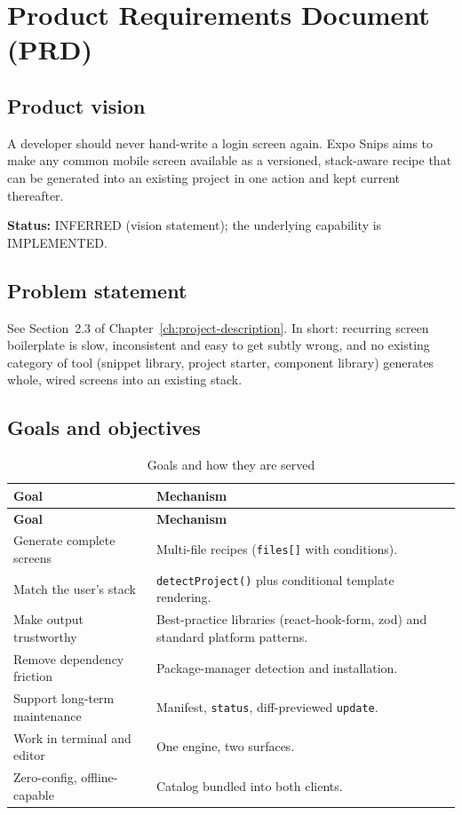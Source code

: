 \chapter{Product Requirements Document (PRD)}
\label{ch:prd}

\section{Product vision}

A developer should never hand-write a login screen again. Expo Snips aims to make
any common mobile screen available as a versioned, stack-aware recipe that can be
generated into an existing project in one action and kept current thereafter.

\textbf{Status:} INFERRED (vision statement); the underlying capability is
IMPLEMENTED.

\section{Problem statement}

See Section~2.3 of Chapter~\ref{ch:project-description}. In short: recurring
screen boilerplate is slow, inconsistent and easy to get subtly wrong, and no
existing category of tool (snippet library, project starter, component library)
generates whole, wired screens into an existing stack.

\section{Goals and objectives}

\begin{longtable}{@{}L{6cm}L{8.6cm}@{}}
\caption{Goals and how they are served}\\
\toprule
\textbf{Goal} & \textbf{Mechanism} \\
\midrule
\endfirsthead
\toprule
\textbf{Goal} & \textbf{Mechanism} \\
\midrule
\endhead
Generate complete screens & Multi-file recipes (\texttt{files[]} with conditions). \\
Match the user's stack & \texttt{detectProject()} plus conditional template rendering. \\
Make output trustworthy & Best-practice libraries (react-hook-form, zod) and standard platform patterns. \\
Remove dependency friction & Package-manager detection and installation. \\
Support long-term maintenance & Manifest, \texttt{status}, diff-previewed \texttt{update}. \\
Work in terminal and editor & One engine, two surfaces. \\
Zero-config, offline-capable & Catalog bundled into both clients. \\
\bottomrule
\end{longtable}

